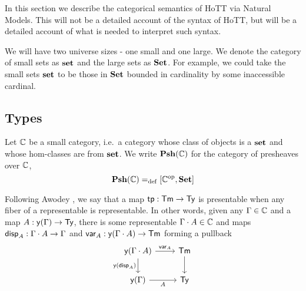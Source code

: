 In this section we describe the categorical semantics of
HoTT via Natural Models.
This will not be a detailed account of the syntax of HoTT,
but will be a detailed account of what is needed to interpret such syntax.

\medskip

\begin{notation*}
  We will have two universe sizes - one small and one large.
  We denote the category of small sets as $\mathbf{set}$ and the large sets as $\mathbf{Set}$.
  For example, we could take the small sets $\mathbf{set}$ to be those in $\mathbf{Set}$ bounded in cardinality
  by some inaccessible cardinal.
\end{notation*}

\subsection{Types}


Let $\mathbb{C}$ be a small category, i.e.~a category whose class of objects is a $\mathbf{set}$ and
whose hom-classes are from $\mathbf{set}$.
We write $\mathbf{Psh}(\mathbb{C})$ for the category of presheaves over $\mathbb{C}$,
\[
\mathbf{Psh}(\mathbb{C}) =_{\mathrm{def}} [\mathbb{C}^{\mathrm{op}}, \mathbf{Set}]
\]

\medskip


\begin{defn}
  Following Awodey \cite{awodey2017naturalmodelshomotopytype},
  we say that a map $\mathsf{tp} : \mathsf{Tm} \to \mathsf{Ty}$ is presentable when
  any fiber of a representable is representable.
  In other words, given any $\Gamma \in \mathbb{C}$ and a map $A : \mathsf{y} (\Gamma) \to \mathsf{Ty}$,
  there is some representable $\Gamma \cdot A \in \mathbb{C}$ and maps $\mathsf{disp}_{A} : \Gamma \cdot A \to \Gamma$
  and $\mathsf{var}_{A} : \mathsf{y} (\Gamma \cdot A) \to \mathsf{Tm}$ forming a pullback
\[\begin{tikzcd}
	{\yo (\Ga \cdot A)} & \Term \\
	{\yo (\Ga)} & \Type
	\arrow["{\var_A}", from=1-1, to=1-2]
	\arrow["{\yo (\disp{A})}"', from=1-1, to=2-1]
	\arrow[from=1-2, to=2-2]
	\arrow["A"', from=2-1, to=2-2]
\end{tikzcd}\]
\end{defn}


